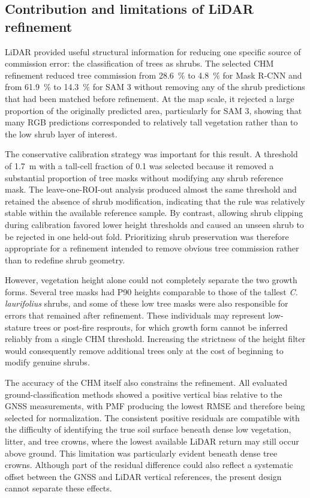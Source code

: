 \documentclass[12pt,a4paper]{article}
\begin{document}
\subsection{Contribution and limitations of LiDAR refinement}

LiDAR provided useful structural information for reducing one specific source of commission error: the classification of trees as shrubs. The selected CHM refinement reduced tree commission from \qty{28.6}{\percent} to \qty{4.8}{\percent} for Mask R-CNN and from \qty{61.9}{\percent} to \qty{14.3}{\percent} for SAM 3 without removing any of the shrub predictions that had been matched before refinement. At the map scale, it rejected a large proportion of the originally predicted area, particularly for SAM 3, showing that many RGB predictions corresponded to relatively tall vegetation rather than to the low shrub layer of interest.

The conservative calibration strategy was important for this result. A threshold of \qty{1.7}{\metre} with a tall-cell fraction of 0.1 was selected because it removed a substantial proportion of tree masks without modifying any shrub reference mask. The leave-one-ROI-out analysis produced almost the same threshold and retained the absence of shrub modification, indicating that the rule was relatively stable within the available reference sample. By contrast, allowing shrub clipping during calibration favored lower height thresholds and caused an unseen shrub to be rejected in one held-out fold. Prioritizing shrub preservation was therefore appropriate for a refinement intended to remove obvious tree commission rather than to redefine shrub geometry.

However, vegetation height alone could not completely separate the two growth forms. Several tree masks had P90 heights comparable to those of the tallest \textit{C. laurifolius} shrubs, and some of these low tree masks were also responsible for errors that remained after refinement. These individuals may represent low-stature trees or post-fire resprouts, for which growth form cannot be inferred reliably from a single CHM threshold. Increasing the strictness of the height filter would consequently remove additional trees only at the cost of beginning to modify genuine shrubs.

The accuracy of the CHM itself also constrains the refinement. All evaluated ground-classification methods showed a positive vertical bias relative to the GNSS measurements, with PMF producing the lowest RMSE and therefore being selected for normalization. The consistent positive residuals are compatible with the difficulty of identifying the true soil surface beneath dense low vegetation, litter, and tree crowns, where the lowest available LiDAR return may still occur above ground. This limitation was particularly evident beneath dense tree crowns. Although part of the residual difference could also reflect a systematic offset between the GNSS and LiDAR vertical references, the present design cannot separate these effects.
\end{document}
